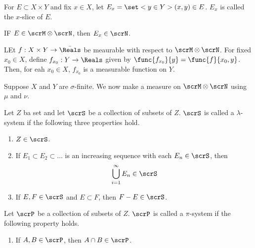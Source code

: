 \begin{definition}
    For \(E \subset X \times Y\) and fix \(x \in X\), let \(E_x = \set<y \in Y>{(x,y) \in E}\). \(E_x\) is called the \(x\)-slice of \(E\).
\end{definition}

\begin{proposition}
    IF \(E \in \scrM \otimes \scrN\), then \(E_x \in \scrN\).
\end{proposition}

\begin{corollary}
    LEt \(f: X \times Y \to \bar{\Reals}\) be meaurable with respect to \(\scrM \otimes \scrN\). For fixed \(x_0 \in X\), define \(f_{x_0} : Y \to \Reals\) given by \(\func{f_{x_0}}{y} = \func{f}{x_0,y}\). Then, for eah \(x_0 \in X\), \(f_{x_0}\) is a measurable function on \(Y\).
\end{corollary}

Suppose \(X\) and \(Y\) are \(\sigma\)-finite. We now make a measure on \(\scrM \otimes \scrN\) using \(\mu\) and \(\nu\).

\begin{definition}
    Let \(Z\) ba set and let \(\scrS\) be a collection of subsets of \(Z\). \(\scrS\) is called a \(\lambda\)-system if the following three properties hold. 
    \begin{enumerate}[label = \(\lambda\)\arabic*.]
        \item \(Z \in \scrS\).
        \item If \(E_1 \subset E_2 \subset \dots\) is an increasing sequence with each \(E_n \in \scrS\), then 
        \begin{equation*}
            \bigcup_{i = 1}^{\infty} E_n \in \scrS
        \end{equation*}
        \item If \(E,F \in \scrS\) and \(E \subset F\), then \(F - E \in \scrS\).
    \end{enumerate}
\end{definition}

\begin{definition}
    Let \(\scrP\) be a collection of subsets of \(Z\). \(\scrP\) is called a \(\pi\)-system if the following  property holds. 
    \begin{enumerate}[label = \(\pi\)\arabic*.]

        \item If \(A,B \in \scrP\), then \(A \cap B \in \scrP\).
    \end{enumerate}
\end{definition}

